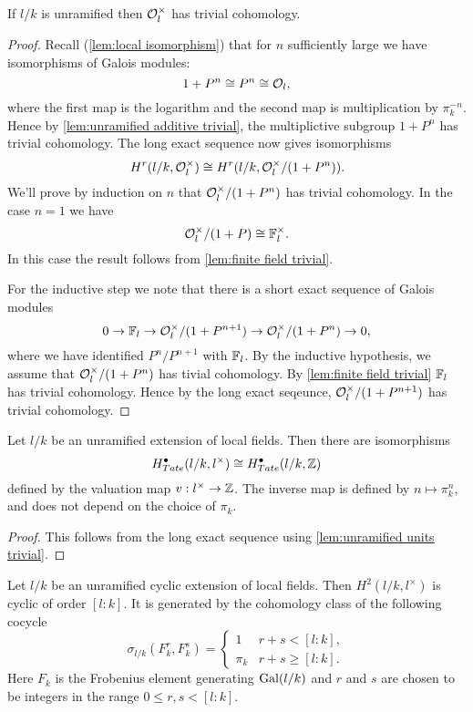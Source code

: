 \begin{lemma}	\label{lem:unramified units trivial}
	If $l/k$ is unramified then ${\mathcal O}_l^\times$ has trivial cohomology.
\end{lemma}

\begin{proof}
	Recall (\ref{lem:local isomorphism}) that for $n$ sufficiently large we have isomorphisms of
	Galois modules:
	\[
		1 + P^n \cong P^n \cong {\mathcal O}_l,
	\]
	where the first map is the logarithm and the second map is multiplication by $\pi_k^{-n}$.
	Hence by \ref{lem:unramified additive trivial}, the multiplictive subgroup $1+P^n$ has trivial
	cohomology.
	The long exact sequence now gives isomorphisms
	\[
		H^r(l/k,{\mathcal O}_l^\times) \cong H^r(l/k,{\mathcal O}_l^\times / (1+P^n)).
	\]
	We'll prove by induction on $n$ that ${\mathcal O}_l^\times / (1+P^n)$ has trivial cohomology.
	In the case $n = 1$ we have
	\[
		{\mathcal O}_l^\times / (1+P) \cong {\mathbb F}_l^\times.
	\]
	In this case the result follows from \ref{lem:finite field trivial}.

	For the inductive step we note that there is a short exact sequence of Galois modules
	\[
		0 \to {\mathbb F}_l \to  {\mathcal O}_l^\times / (1+P^{n+1})  \to{\mathcal O}_l^\times / (1+P^n)  \to  0,
	\]
	where we have identified $P^n / P^{n+1}$ with ${\mathbb F}_l$.
	By the inductive hypothesis, we assume that ${\mathcal O}_l^\times / (1+P^n)$ has tivial cohomology.
	By \ref{lem:finite field trivial} ${\mathbb F}_l$ has trivial cohomology.
	Hence by the long exact seqeunce, ${\mathcal O}_l^\times / (1+P^{n+1})$ has trivial cohomology.
\end{proof}


\begin{corollary}
	Let $l/k$ be an unramified extension of local fields.
	Then there are isomorphisms
	\[
		H^\bullet_{Tate}(l/k,l^\times) \cong H^\bullet_{Tate} (l/k,{\mathbb Z})
	\]
	defined by the valuation map $v : l^\times \to {\mathbb Z}$.
	The inverse map is defined by $n \mapsto \pi_k^n$, and does not depend on the choice of $\pi_k$.
\end{corollary}

\begin{proof}
	This follows from the long exact sequence using \ref{lem:unramified units trivial}.
\end{proof}


\begin{lemma} \label{lem:unrammified fundamental class}
	Let $l/k$ be an unramified cyclic extension of local fields.
	Then $H^2(l/k,l^\times)$ is cyclic of order $[l:k]$.
	It is generated by the cohomology class of the following cocycle
	\[
		\sigma_{l/k} (F_k^r, F_k^s) =
		\begin{cases}
			1 & r + s < [l:k], \\
			\pi_k & r + s \ge [l:k].
		\end{cases}
	\]
	Here $F_k$ is the Frobenius element generating $\mathrm{Gal}(l/k)$ and $r$ and $s$
	are chosen to be integers in the range $0 \le r,s <[l:k]$.
\end{lemma}


